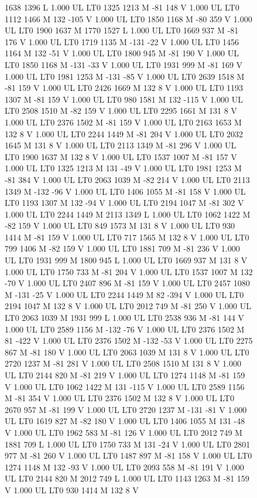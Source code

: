 \documentclass{LMCS}
\begin{document}
\begin{figure}[!tbp]
{{{1638 1396 L
1.000 UL
LT0
1325 1213 M
-81 148 V
1.000 UL
LT0
1112 1466 M
132 -105 V
1.000 UL
LT0
1850 1168 M
-80 359 V
1.000 UL
LT0
1900 1637 M
1770 1527 L
1.000 UL
LT0
1669 937 M
-81 176 V
1.000 UL
LT0
1719 1135 M
-131 -22 V
1.000 UL
LT0
1456 1164 M
132 -51 V
1.000 UL
LT0
1800 945 M
-81 190 V
1.000 UL
LT0
1850 1168 M
-131 -33 V
1.000 UL
LT0
1931 999 M
-81 169 V
1.000 UL
LT0
1981 1253 M
-131 -85 V
1.000 UL
LT0
2639 1518 M
-81 159 V
1.000 UL
LT0
2426 1669 M
132 8 V
1.000 UL
LT0
1193 1307 M
-81 159 V
1.000 UL
LT0
980 1581 M
132 -115 V
1.000 UL
LT0
2508 1510 M
-82 159 V
1.000 UL
LT0
2295 1661 M
131 8 V
1.000 UL
LT0
2376 1502 M
-81 159 V
1.000 UL
LT0
2163 1653 M
132 8 V
1.000 UL
LT0
2244 1449 M
-81 204 V
1.000 UL
LT0
2032 1645 M
131 8 V
1.000 UL
LT0
2113 1349 M
-81 296 V
1.000 UL
LT0
1900 1637 M
132 8 V
1.000 UL
LT0
1537 1007 M
-81 157 V
1.000 UL
LT0
1325 1213 M
131 -49 V
1.000 UL
LT0
1981 1253 M
-81 384 V
1.000 UL
LT0
2063 1039 M
-82 214 V
1.000 UL
LT0
2113 1349 M
-132 -96 V
1.000 UL
LT0
1406 1055 M
-81 158 V
1.000 UL
LT0
1193 1307 M
132 -94 V
1.000 UL
LT0
2194 1047 M
-81 302 V
1.000 UL
LT0
2244 1449 M
2113 1349 L
1.000 UL
LT0
1062 1422 M
-82 159 V
1.000 UL
LT0
849 1573 M
131 8 V
1.000 UL
LT0
930 1414 M
-81 159 V
1.000 UL
LT0
717 1565 M
132 8 V
1.000 UL
LT0
799 1406 M
-82 159 V
1.000 UL
LT0
1881 709 M
-81 236 V
1.000 UL
LT0
1931 999 M
1800 945 L
1.000 UL
LT0
1669 937 M
131 8 V
1.000 UL
LT0
1750 733 M
-81 204 V
1.000 UL
LT0
1537 1007 M
132 -70 V
1.000 UL
LT0
2407 896 M
-81 159 V
1.000 UL
LT0
2457 1080 M
-131 -25 V
1.000 UL
LT0
2244 1449 M
82 -394 V
1.000 UL
LT0
2194 1047 M
132 8 V
1.000 UL
LT0
2012 749 M
-81 250 V
1.000 UL
LT0
2063 1039 M
1931 999 L
1.000 UL
LT0
2538 936 M
-81 144 V
1.000 UL
LT0
2589 1156 M
-132 -76 V
1.000 UL
LT0
2376 1502 M
81 -422 V
1.000 UL
LT0
2376 1502 M
-132 -53 V
1.000 UL
LT0
2275 867 M
-81 180 V
1.000 UL
LT0
2063 1039 M
131 8 V
1.000 UL
LT0
2720 1237 M
-81 281 V
1.000 UL
LT0
2508 1510 M
131 8 V
1.000 UL
LT0
2144 820 M
-81 219 V
1.000 UL
LT0
1274 1148 M
-81 159 V
1.000 UL
LT0
1062 1422 M
131 -115 V
1.000 UL
LT0
2589 1156 M
-81 354 V
1.000 UL
LT0
2376 1502 M
132 8 V
1.000 UL
LT0
2670 957 M
-81 199 V
1.000 UL
LT0
2720 1237 M
-131 -81 V
1.000 UL
LT0
1619 827 M
-82 180 V
1.000 UL
LT0
1406 1055 M
131 -48 V
1.000 UL
LT0
1962 583 M
-81 126 V
1.000 UL
LT0
2012 749 M
1881 709 L
1.000 UL
LT0
1750 733 M
131 -24 V
1.000 UL
LT0
2801 977 M
-81 260 V
1.000 UL
LT0
1487 897 M
-81 158 V
1.000 UL
LT0
1274 1148 M
132 -93 V
1.000 UL
LT0
2093 558 M
-81 191 V
1.000 UL
LT0
2144 820 M
2012 749 L
1.000 UL
LT0
1143 1263 M
-81 159 V
1.000 UL
LT0
930 1414 M
132 8 V
}}}
\end{figure}
\end{document}
